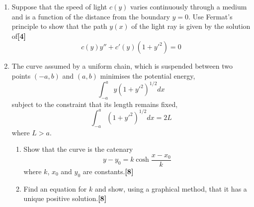 \documentclass[a4paper]{article}
\begin{document}
\newpage
\begin{qns}\leavevmode
\begin{enumerate}[label=(\alph*)]
\item Suppose that the speed of light $c(y)$ varies continuously through a medium and is a function of the distance from the boundary $y = 0$. Use Fermat’s principle to show that the path $y(x)$ of the light ray is given by the solution of\hfill\textbf{[4]}
$$c(y)y''+c'(y)(1+y'^2)=0$$
\item The curve assumed by a uniform chain, which is suspended between two points $(−a, b)$ and $(a, b)$ minimises the potential energy,
$$\int_{-a}^ay(1+y'^2)^{1/2}dx$$
subject to the constraint that its length remains fixed,
$$\int_{-a}^a(1+y'^2)^{1/2}dx=2L$$
where $L>a$.
\begin{enumerate}[label=(\roman*)]
\item Show that the curve is the catenary
$$y-y_0=k\cosh\frac{x-x_0}{k}$$
where $k$, $x_0$ and $y_0$ are constants.\hfill\textbf{[8]}
\item Find an equation for $k$ and show, using a graphical method, that it has a unique positive solution.\hfill\textbf{[8]}
\end{enumerate}
\end{enumerate}
\end{qns}
\end{document}
